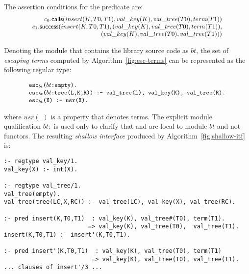 \documentclass{llncs}
\begin{document}
\noindent
The assertion conditions for the  predicate are:
\[
\small
\begin{array}{r}
\textsf{\ensuremath{c_{0}}.calls}(insert(K,T0,T1), val\_key(K), val\_tree(T0), term(T1))\\
c_{1}.\textsf{success}(insert(K,T0,T1),(val\_key(K),val\_tree(T0),term(T1)),\\
(val\_key(K),val\_tree(T0),val\_tree(T1)))
\end{array}
\]

\noindent
%
Denoting the module that contains the library source code as $bt$,
the set of \emph{escaping terms} computed by
Algorithm~\ref{fig:esc-terms} can be represented as the following regular type:


\[
\small
\begin{array}{l}
\mbox{\tt esc}_{bt}\mbox{\tt (}bt\mbox{\tt :empty).}\\
\mbox{\tt esc}_{bt}\mbox{\tt (}bt\mbox{\tt :tree(L,K,R)) :- val\_tree(L), val\_key(K), val\_tree(R).}\\
\mbox{\tt esc}_{bt}\mbox{\tt (X) :- usr(X).}\\
\end{array}
\]

\noindent
where $usr(\_)$ is a property that denotes  terms.
The explicit module qualification $bt\!:$ is used only to clarify that
 and
 are local to module $bt$ and not  functors.
%
The resulting \emph{shallow interface} produced by
Algorithm~\ref{fig:shallow-itf} is:

{\small%
\begin{verbatim}
:- regtype val_key/1.
val_key(X) :- int(X).

:- regtype val_tree/1.
val_tree(empty).
val_tree(tree(LC,X,RC)) :- val_tree(LC), val_key(X), val_tree(RC).

:- pred insert(K,T0,T1)  : val_key(K), val_tree#(T0), term(T1).
                        => val_key(K), val_tree(T0),  val_tree(T1).
insert(K,T0,T1) :- insert'(K,T0,T1).

:- pred insert'(K,T0,T1)  : val_key(K), val_tree(T0), term(T1)
                         => val_key(K), val_tree(T0), val_tree(T1).
... clauses of insert'/3 ...
\end{verbatim}}
\end{document}

